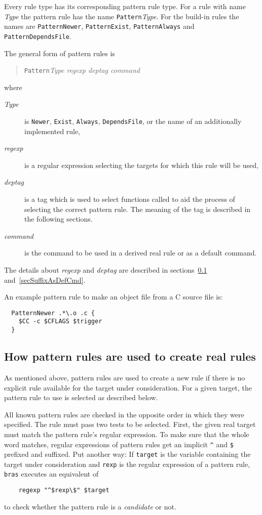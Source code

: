 \documentclass[12pt]{article}
\newcommand{\bras}{\texttt{bras}}
\begin{document}
Every rule type has its corresponding pattern rule type. 
For a rule with name \textit{Type} the pattern rule has the name
\texttt{Pattern}\textit{Type}. For the build-in rules the names are
\texttt{PatternNewer}, \texttt{PatternExist},
\texttt{PatternAlways} and \texttt{PatternDependsFile}.

The general form of pattern rules is
\begin{quote}
\texttt{Pattern}\textit{Type regexp deptag command}
\end{quote}

where 

\begin{description}
\item[\textit{Type}] 
  is \texttt{Newer}, \texttt{Exist},
  \texttt{Always}, \texttt{DependsFile}, or the name of an additionally
  implemented rule, 
\item[\textit{regexp}] 
  is a regular expression selecting the targets
  for which this rule will be used,
\item[\textit{deptag}]
  is a tag which is used to select functions called to aid the
  process of selecting the correct pattern rule. The meaning of the
  tag is described in the following sections.
\item[\textit{command}] 
  is the command to be used in a derived real
  rule or as a default command.
\end{description}

The details about \textit{regexp} and \textit{deptag} are described
in sections~\ref{secSuffixToReal} and~\ref{secSuffixAsDefCmd}.

An example pattern rule to make an object file from a C source file is:
\begin{verbatim}
  PatternNewer .*\.o .c {
    $CC -c $CFLAGS $trigger
  }
\end{verbatim}


\subsection{How pattern rules are used to create real rules}
\label{secSuffixToReal}

As mentioned above, pattern rules are used to create a new rule if
there is no explicit rule available for the target under
consideration. 
For a given target, the pattern rule to use is selected as described
below.

All known pattern rules are checked in the opposite order in which
they were specified. The rule must pass two tests to be selected.
First, the given real target must match the pattern rule's regular
expression. To make sure that the whole word matches, regular
expressions of pattern rules get an implicit \verb+^+ and \texttt{\$}
prefixed and suffixed. Put another way: If \texttt{target} is the
variable containing the target under consideration and \texttt{rexp}
is the regular expression of a pattern rule, \bras{} executes an
equivalent of
\begin{verbatim}
    regexp "^$rexp\$" $target
\end{verbatim}
to check whether the pattern rule is a \textit{candidate} or not.
\end{document}
